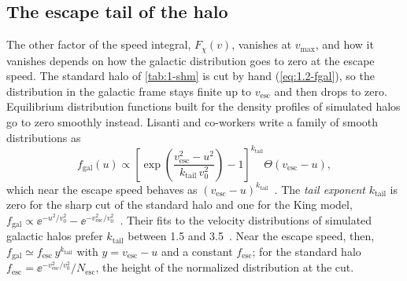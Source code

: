 \subsection{The escape tail of the halo}\label{sec:21.3-tail}

The other factor of the speed integral, $F_\chi(v)$, vanishes at $v_{\mathrm{max}}$, and how it vanishes depends on how the galactic distribution goes to zero at the escape speed. The standard halo of \cref{tab:1-shm} is cut by hand (\cref{eq:1.2-fgal}), so the distribution in the galactic frame stays finite up to $v_{\mathrm{esc}}$ and then drops to zero. Equilibrium distribution functions built for the density profiles of simulated halos go to zero smoothly instead. Lisanti and co-workers write a family of smooth distributions as~\cite[Eq.~(1)]{lisanti2011dark}
\begin{equation*}
  f_{\mathrm{gal}}(u) \propto \left[\exp\!\left(\frac{v_{\mathrm{esc}}^2 - u^2}{k_{\mathrm{tail}}\,v_0^2}\right) - 1\right]^{k_{\mathrm{tail}}}\Theta(v_{\mathrm{esc}} - u) ,
\end{equation*}
which near the escape speed behaves as $(v_{\mathrm{esc}} - u)^{k_{\mathrm{tail}}}$~\cite[Eq.~(11)]{lisanti2011dark}. The \emph{tail exponent} $k_{\mathrm{tail}}$ is zero for the sharp cut of the standard halo and one for the King model, $f_{\mathrm{gal}} \propto \ee^{-u^2/v_0^2} - \ee^{-v_{\mathrm{esc}}^2/v_0^2}$~\cite[Eq.~(12)]{lisanti2011dark}. Their fits to the velocity distributions of simulated galactic halos prefer $k_{\mathrm{tail}}$ between 1.5 and 3.5~\cite[Sect.~II, Eq.~(10), and Fig.~3]{lisanti2011dark}. Near the escape speed, then, $f_{\mathrm{gal}} \simeq f_{\mathrm{esc}}\,y^{k_{\mathrm{tail}}}$ with $y = v_{\mathrm{esc}} - u$ and a constant $f_{\mathrm{esc}}$; for the standard halo $f_{\mathrm{esc}} = \ee^{-v_{\mathrm{esc}}^2/v_0^2}/N_{\mathrm{esc}}$, the height of the normalized distribution at the cut.

